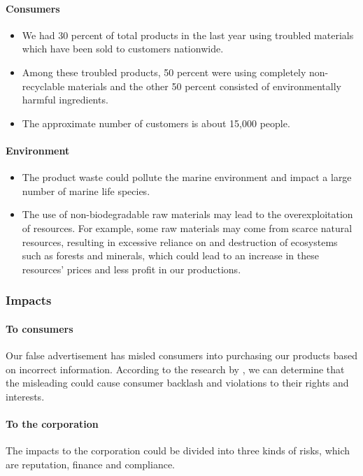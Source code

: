 \documentclass[12pt]{article}
\begin{document}
\paragraph{Consumers}
\begin{itemize}
  \item We had 30 percent of total products in the last year using troubled materials which have been sold to customers nationwide.
  \item Among these troubled products, 50 percent were using completely non-recyclable materials and the other 50 percent consisted of environmentally harmful ingredients.
  \item The approximate number of customers is about 15,000 people.
\end{itemize}

\paragraph{Environment}
\begin{itemize}
  \item The product waste could pollute the marine environment and impact a large number of marine life species.
  \item The use of non-biodegradable raw materials may lead to the overexploitation of resources. For example, some raw materials may come from scarce natural resources, resulting in excessive reliance on and destruction of ecosystems such as forests and minerals, which could lead to an increase in these resources' prices \citep{hotelling2021exhaustible} and less profit in our productions.
\end{itemize}

\subsubsection{Impacts}

\paragraph{To consumers}
Our false advertisement has misled consumers into purchasing our products based on incorrect information. According to the research by \citet{torelli2019greenwashing}, we can determine that the misleading could cause consumer backlash and violations to their rights and interests.

\paragraph{To the corporation}
The impacts to the corporation could be divided into three kinds of risks, which are reputation, finance and compliance.
\end{document}
